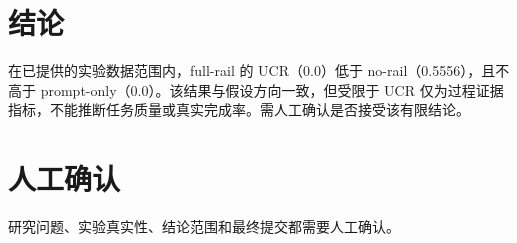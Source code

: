 \documentclass[UTF8]{ctexart}
\begin{document}
\section{结论}
在已提供的实验数据范围内，full-\allowbreak{}rail 的 UCR（0.0）低于 no-\allowbreak{}rail（0.5556），且不高于 prompt-\allowbreak{}only（0.0）。该结果与假设方向一致，但受限于 UCR 仅为过程证据指标，不能推断任务质量或真实完成率。需人工确认是否接受该有限结论。
\section{人工确认}
研究问题、实验真实性、结论范围和最终提交都需要人工确认。
\end{document}
